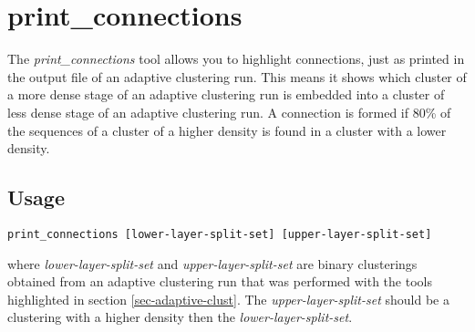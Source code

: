 \section{print\_connections}
The \emph{print\_connections} tool allows you to highlight
connections, just as printed in the output file of an adaptive
clustering run. This means it shows which cluster of a more dense
stage of an adaptive clustering run is embedded into a cluster of less
dense stage of an adaptive clustering run. A connection is formed if
80\% of the sequences of a cluster of a higher density is found in a
cluster with a lower density. 

\subsection{Usage}
\begin{lstlisting}
print_connections [lower-layer-split-set] [upper-layer-split-set]
\end{lstlisting}
where \emph{lower-layer-split-set} and \emph{upper-layer-split-set}
are binary clusterings obtained from an adaptive clustering run that
was performed with the tools highlighted in section \ref{sec-adaptive-clust}. The
\emph{upper-layer-split-set} should be a clustering with a higher
density then the \emph{lower-layer-split-set}. 

